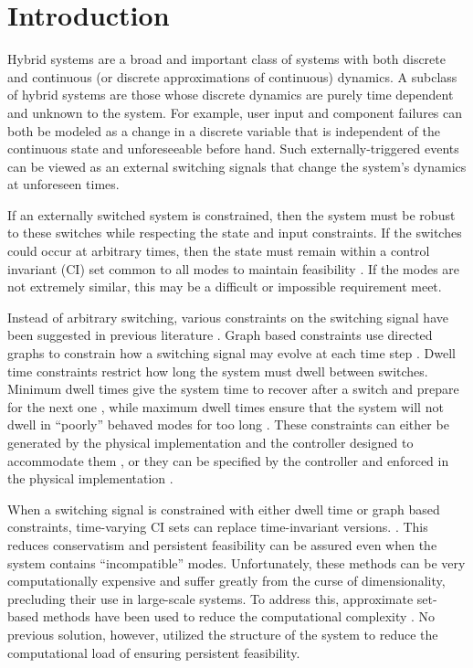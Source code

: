 \section{Introduction}
Hybrid systems are a broad and important class of systems with both discrete and continuous (or discrete approximations of continuous) dynamics. A subclass of hybrid systems are those whose discrete dynamics are purely time dependent and unknown to the system. For example, user input and component failures can both be modeled as a change in a discrete variable that is independent of the continuous state and unforeseeable before hand. Such externally-triggered events can be viewed as an external switching signals that change the system's dynamics at unforeseen times. 

If an externally switched system is constrained, then the system must be robust to these switches while respecting the state and input constraints. If the switches could occur at arbitrary times, then the state must remain within a control invariant (CI) set common to all modes to maintain feasibility \cite{Liberzon1999, Blanchini1999}. If the modes are not extremely similar, this may be a difficult or impossible requirement meet. 

Instead of arbitrary switching, various constraints on the switching signal have been suggested in previous literature \cite{Liberzon1999,Morse1999}. Graph based constraints use directed graphs to constrain how a switching signal may evolve at each time step \cite{Santis2004, Athanasopoulos2014, Athanasopoulos2017, Fiacchini2018}. Dwell time constraints restrict how long the system must dwell between switches. Minimum dwell times give the system time to recover after a switch and prepare for the next one \cite{Danielson2019,Lavaei2021}, while maximum dwell times ensure that the system will not dwell in ``poorly'' behaved modes for too long \cite{Hall2022}. These constraints can either be generated by the physical implementation and the controller designed to accommodate them \cite{Danielson2019}, or they can be specified by the controller and enforced in the physical implementation \cite{Zhang2016}. 

When a switching signal is constrained with either dwell time or graph based constraints, time-varying CI sets can replace time-invariant versions. \cite{Danielson2019, Athanasopoulos2017}. This reduces conservatism and persistent feasibility can be assured even when the system contains ``incompatible'' modes. Unfortunately, these methods can be very computationally expensive and suffer greatly from the curse of dimensionality, precluding their use in large-scale systems. To address this, approximate set-based methods have been used to reduce the computational complexity \cite{Santis2004,Athanasopoulos2017}. No previous solution, however, utilized the structure of the system to reduce the computational load of ensuring persistent feasibility. 

